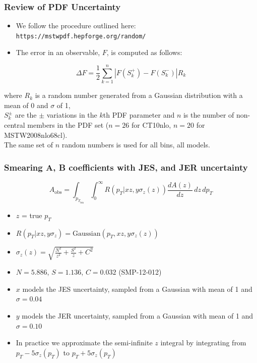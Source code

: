 \documentclass{beamer}
\begin{document}
\begin{frame}
	\frametitle{Review of PDF Uncertainty}
	\begin{itemize}
		\item We follow the procedure outlined here:\\ \texttt{https://mstwpdf.hepforge.org/random/}
		\item The error in an observable, $F$, is computed as follows:
	\end{itemize}
	\[ \Delta F = \frac{1}{2}\sum_{k=1}^{n} \left| F(S_{k}^{+}) -F(S_{k}^{-}) \right| R_{k}\]
	
	\small
		where $R_{k}$ is a random number generated from a Gaussian distribution with a mean of 0 and $\sigma$ of 1,\\
		\vspace{0.2in}
		$S^{\pm}_{k}$ are the ${\pm}$ variations in the $k$th PDF parameter
		and $n$ is the number of non-central members in the PDF set ($n=26$ for CT10nlo, $n=20$ for MSTW2008nlo68cl). \\
		{\color{blue} The same set of $n$ random numbers is used for all bins, all models.} 
	\normalsize	 	
\end{frame}


\begin{frame}
	\frametitle{Smearing A, B coefficients with JES, and JER uncertainty}
	
	\[ A_{\mbox{obs}} = \int_{p_T_{\mbox{bin}}} \int_{0}^{\infty} R\left( p_T | xz,y\sigma_z(z) \right)\frac{d A\left(z \right)}{dz} \, dz \,dp_T \]
	
	\begin{itemize}
		\item $z$ =  true $p_{T}$
		\item $ R\left( p_T | xz,y\sigma_z \right) = \mbox{Gaussian}\left(p_T, xz, y\sigma_z(z) \right) $
		\item $ \sigma_z(z) = \sqrt{\frac{N^2}{z^2} + \frac{S^2}{z} + C^2 } $
		\item $N=5.886$, $S=1.136$, $C=0.032$  (SMP-12-012)
		\item $x$ models the JES uncertainty, sampled from  a Gaussian with mean of 1 and $\sigma=0.04$
		\item $y$ models the JER uncertainty, sampled from a Gaussian with mean of 1 and $\sigma=0.10$
		\item In practice we approximate the semi-infinite $z$ integral by integrating from $p_T-5\sigma_z(p_T)$ to $p_T+5\sigma_z(p_T)$
	\end{itemize}
\end{frame}
\end{document}
